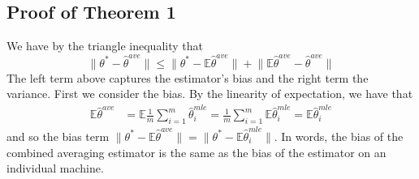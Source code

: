 \documentclass[twoside]{article}
\newcommand{\E}{\mathbb{E}}
\newcommand{\w}{\theta}
\newcommand{\wave}{\hat\w^{ave}}
\newcommand{\wmle}{\hat\w^{mle}}
\newcommand{\wstar}{{\w^{*}}}
\newcommand{\ltwo}[1]{{\lVert {#1} \rVert}}
\begin{document}

\subsection {Proof of Theorem 1}

We have by the triangle inequality that
\begin{equation}
\ltwo{\wstar-\wave} \le \ltwo{\wstar-\E\wave} + \ltwo{\E\wave-\wave}
\label{eq:biasvar}
\end{equation}
The left term above captures the estimator's bias and the right term the variance.
First we consider the bias.
By the linearity of expectation, we have that
\begin{align}
\E\wave
&=
\E\frac{1}{m}\sum_{i=1}^m\wmle_i
=
\frac{1}{m}\sum_{i=1}^m\E\wmle_i
=
\E\wmle_i
\label{eq:expwave}
\end{align}
and so the bias term
$\ltwo{\wstar-\E\wave}
=
\ltwo{\wstar-\E\wmle_i}
$.
In words, the bias of the combined averaging estimator is the same as the bias of the estimator on an individual machine.
\end{document}
